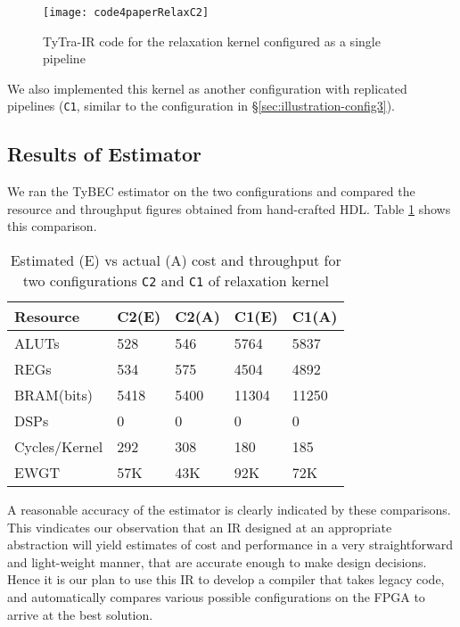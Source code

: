 \documentclass[]{heart2015_WN4Pre}
\begin{document}
\begin{figure}[th]
\centering
\texttt{[image: code4paperRelaxC2]}
\caption{TyTra-IR code for the relaxation kernel configured as a single pipeline}
\label{fig:code4paperRelaxC2}
\end{figure}

We also implemented this kernel as another configuration with replicated pipelines (\texttt{C1}, similar to the configuration in \S\ref{sec:illustration-config3}).

\subsection*{Results of Estimator}
We ran the TyBEC estimator on the two configurations and compared the resource and throughput figures obtained from hand-crafted HDL. Table \ref{tab:estVactualRelax} shows this comparison.

\begin{table}
\begin{tabular}{|p{14ex}|p{8ex}|p{8ex}|p{8ex}|p{8ex}|}
\hline \textbf{Resource}& \textbf{C2(E)} & \textbf{C2(A)} & \textbf{C1(E)} & \textbf{C1(A)} \\ 
	\hline ALUTs 			& 528 	& 546 	& 5764 	&  5837	\\ 
	\hline REGs 			& 534 	& 575 	& 4504 	&  4892 \\ 
	\hline BRAM(bits) 		& 5418 	& 5400 	& 11304 &  11250 \\ 
	\hline DSPs 			& 0 	& 0 	& 0 	&  0   \\ 
	\hline
	\hline Cycles/Kernel	& 292  	& 308 	& 180 	&  185	\\ 		
	\hline EWGT       		& 57K  	& 43K 	& 92K 	&  72K	\\ 		
	\hline 
\end{tabular} 
	\caption{Estimated (E) vs actual (A) cost and throughput for two configurations \texttt{C2} and \texttt{C1} of relaxation kernel}
	\label{tab:estVactualRelax}
\end{table}



A reasonable accuracy of the estimator is clearly indicated by these comparisons. This vindicates our observation that an IR designed at an appropriate abstraction will yield estimates of cost and performance in a very straightforward and light-weight manner, that are accurate enough to make design decisions. Hence it is our plan to use this IR to develop a compiler that takes legacy code, and automatically compares various possible configurations on the FPGA to arrive at the best solution.
\end{document}
